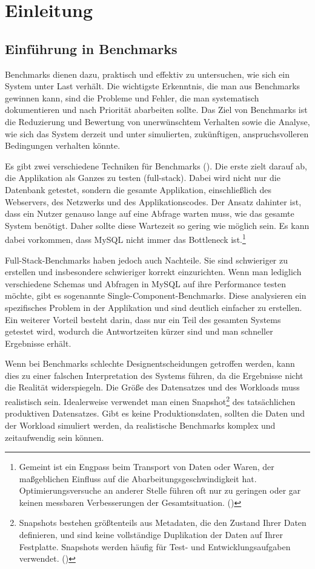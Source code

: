 \chapter{Einleitung}\label{ch:einleitung}

\section{Einführung in Benchmarks}\label{sec:einleitung-einfuehrung}

Benchmarks dienen dazu, praktisch und effektiv zu untersuchen, wie sich ein System unter Last verhält.
Die wichtigste Erkenntnis, die man aus Benchmarks gewinnen kann, sind die Probleme und Fehler, die man systematisch dokumentieren und nach Priorität abarbeiten sollte.
Das Ziel von Benchmarks ist die Reduzierung und Bewertung von unerwünschtem Verhalten sowie die Analyse, wie sich das System derzeit und unter simulierten, zukünftigen, anspruchsvolleren Bedingungen verhalten könnte.

Es gibt zwei verschiedene Techniken für Benchmarks (\cite[pp. 35--49]{schwartz2012high}).
Die erste zielt darauf ab, die Applikation als Ganzes zu testen (full-stack).
Dabei wird nicht nur die Datenbank getestet, sondern die gesamte Applikation, einschließlich des Webservers,
des Netzwerks und des Applikationscodes.
Der Ansatz dahinter ist, dass ein Nutzer genauso lange auf eine Abfrage warten muss, wie das gesamte System benötigt.
Daher sollte diese Wartezeit so gering wie möglich sein.
Es kann dabei vorkommen, dass MySQL nicht immer das Bottleneck ist.\footnote{Gemeint ist ein Engpass beim Transport von Daten oder Waren, der maßgeblichen Einfluss auf die Abarbeitungsgeschwindigkeit hat. Optimierungsversuche an anderer Stelle führen oft nur zu geringen oder gar keinen messbaren Verbesserungen der Gesamtsituation. (\cite{bottleneck})}

Full-Stack-Benchmarks haben jedoch auch Nachteile.
Sie sind schwieriger zu erstellen und insbesondere schwieriger korrekt einzurichten.
Wenn man lediglich verschiedene Schemas und Abfragen in MySQL auf ihre Performance testen möchte, gibt es sogenannte Single-Component-Benchmarks.
Diese analysieren ein spezifisches Problem in der Applikation und sind deutlich einfacher zu erstellen.
Ein weiterer Vorteil besteht darin, dass nur ein Teil des gesamten Systems getestet wird, wodurch die Antwortzeiten
kürzer sind und man schneller Ergebnisse erhält.

Wenn bei Benchmarks schlechte Designentscheidungen getroffen werden, kann dies zu einer falschen Interpretation des Systems führen, da die Ergebnisse nicht die Realität widerspiegeln.
Die Größe des Datensatzes und des Workloads muss realistisch sein.
Idealerweise verwendet man einen Snapshot\footnote{Snapshots bestehen größtenteils aus Metadaten, die den Zustand Ihrer Daten definieren, und sind keine vollständige Duplikation der Daten auf Ihrer Festplatte. Snapshots werden häufig für Test- und Entwicklungsaufgaben verwendet. (\cite{snapshot}) } des tatsächlichen produktiven Datensatzes.
Gibt es keine Produktionsdaten, sollten die Daten und der Workload simuliert werden, da realistische Benchmarks komplex und zeitaufwendig sein können.

